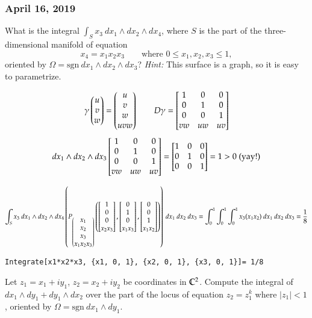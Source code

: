 \subsubsection*{April 16, 2019}

What is the integral $\int_S x_3\ dx_1\land dx_2\land dx_4$, where $S$ is the part of the three-dimensional manifold of equation
\[x_4 = x_1x_2x_3\qquad \text{where }0\leq x_1, x_2, x_3\leq 1,\]
oriented by $\Omega = \mathrm{sgn}\ dx_1\land dx_2\land dx_3$? \emph{Hint: }This surface is a graph, so it is easy to parametrize. 

\[\gamma\begin{pmatrix} u \\ v \\ w \end{pmatrix} = \begin{pmatrix} u \\ v \\ w \\ uvw \end{pmatrix}\qquad D\gamma = \begin{bmatrix} 1 & 0 & 0 \\ 0 & 1 & 0 \\ 0 & 0 & 1 \\ vw & uw & uv \end{bmatrix}\]
\[dx_1\land dx_2\land dx_3 \begin{bmatrix} 1 & 0 & 0 \\ 0 & 1 & 0 \\ 0 & 0 & 1 \\ vw & uw & uv \end{bmatrix} = \begin{bmatrix} 1 & 0 & 0 \\ 0 & 1 & 0 \\ 0 & 0 & 1 \end{bmatrix} = 1>0 \text{ (yay!)}\]

\[\int_S x_3\ dx_1\land dx_2\land dx_4\left(P_{\begin{pmatrix} x_1 \\ x_2 \\ x_3 \\ x_1x_2x_3 \end{pmatrix}}\left(\begin{bmatrix} 1 \\ 0 \\ 0 \\ x_2x_3 \end{bmatrix},\begin{bmatrix} 0 \\ 1 \\ 0 \\ x_1x_3 \end{bmatrix}, \begin{bmatrix} 0 \\ 0 \\ 1 \\ x_1x_2 \end{bmatrix}\right)\right)\ dx_1\ dx_2\ dx_3 = \int_0^1 \int_0^1 \int_0^1 x_3 (x_1x_2)\ dx_1\ dx_2\ dx_3=\frac{1}{8}\]

\texttt{Integrate[x1*x2*x3, \{x1, 0, 1\}, \{x2, 0, 1\}, \{x3, 0, 1\}]= 1/8}

 Let $z_1=x_1+iy_1$, $z_2=x_2+iy_2$ be coordinates in $\mathbb{C}^2$. Compute the integral of $dx_1\land dy_1 + dy_1\land dx_2$ over the part of the locus of equation $z_2=z_1^k$ where $|z_1|<1$, oriented by $\Omega=\mathrm{sgn}\ dx_1 \land dy_1$. 

